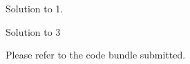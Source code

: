 \documentclass[answers]{exam}
\begin{document}
\begin{questions}
    \question
    \begin{solution}
        Solution to 1.
    \end{solution}

    \question

    \question
    \begin{solution}
        Solution to 3
    \end{solution}

    \question
    \begin{solution}
        Please refer to the code bundle submitted.
    \end{solution}
\end{questions}
\end{document}
